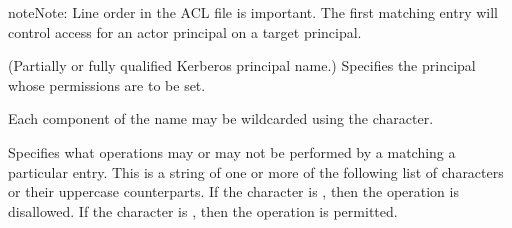 \documentclass[letterpaper,10pt,english]{sphinxmanual}
\begin{document}
\begin{sphinxadmonition}{note}{Note:}
\sphinxAtStartPar
Line order in the ACL file is important.  The first matching entry
will control access for an actor principal on a target principal.
\end{sphinxadmonition}
\begin{description}
\sphinxAtStartPar
(Partially or fully qualified Kerberos principal name.) Specifies
the principal whose permissions are to be set.

\sphinxAtStartPar
Each component of the name may be wildcarded using the \sphinxcode{\sphinxupquote{*}}
character.

\sphinxAtStartPar
Specifies what operations may or may not be performed by a
 matching a particular entry.  This is a string of one or
more of the following list of characters or their upper\sphinxhyphen{}case
counterparts.  If the character is , then the operation
is disallowed.  If the character is , then the operation
is permitted.



\end{description}
\end{document}
